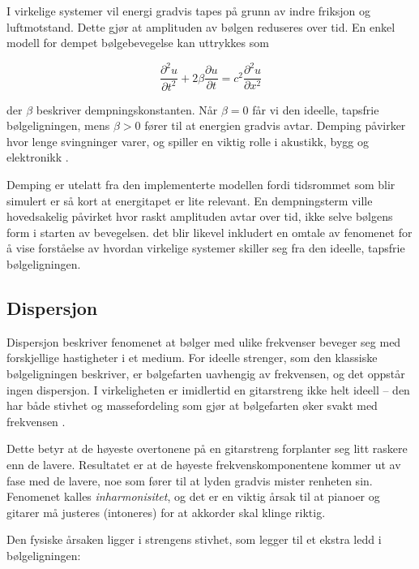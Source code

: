 I virkelige systemer vil energi gradvis tapes på grunn av indre friksjon og luftmotstand.  
Dette gjør at amplituden av bølgen reduseres over tid.  
En enkel modell for dempet bølgebevegelse kan uttrykkes som

\begin{equation*}
\frac{\partial^2 u}{\partial t^2} + 2\beta \frac{\partial u}{\partial t} = c^2 \frac{\partial^2 u}{\partial x^2}
\end{equation*}

der $\beta$ beskriver dempningskonstanten.  
Når $\beta = 0$ får vi den ideelle, tapsfrie bølgeligningen, mens $\beta > 0$ fører til at energien gradvis avtar.  
Demping påvirker hvor lenge svingninger varer, og spiller en viktig rolle i akustikk, bygg og elektronikk \parencite{libretextsDamping}.

Demping er utelatt fra den implementerte modellen fordi tidsrommet som blir simulert er så kort at energitapet er lite relevant.
En dempningsterm ville hovedsakelig påvirket hvor raskt amplituden avtar over tid, ikke selve bølgens form i starten av bevegelsen.
det blir likevel inkludert en omtale av fenomenet for å vise forståelse av hvordan virkelige systemer skiller seg fra den ideelle, tapsfrie bølgeligningen.

\subsection{Dispersjon}

Dispersjon beskriver fenomenet at bølger med ulike frekvenser beveger seg med forskjellige hastigheter i et medium.  
For ideelle strenger, som den klassiske bølgeligningen beskriver, er bølgefarten uavhengig av frekvensen, og det oppstår ingen dispersjon.  
I virkeligheten er imidlertid en gitarstreng ikke helt ideell – den har både stivhet og massefordeling som gjør at bølgefarten øker svakt med frekvensen \parencite{kartofelev2019dispersive}.  

Dette betyr at de høyeste overtonene på en gitarstreng forplanter seg litt raskere enn de lavere.  
Resultatet er at de høyeste frekvenskomponentene kommer ut av fase med de lavere, noe som fører til at lyden gradvis mister renheten sin.  
Fenomenet kalles \textit{inharmonisitet}, og det er en viktig årsak til at pianoer og gitarer må justeres (intoneres) for at akkorder skal klinge riktig.  

Den fysiske årsaken ligger i strengens stivhet, som legger til et ekstra ledd i bølgeligningen:  

